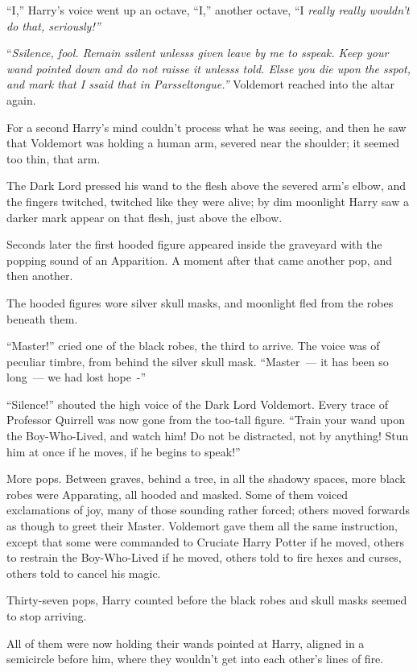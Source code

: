 ``I,'' Harry's voice went up an octave, ``I,'' another octave, ``I \emph{really really wouldn't do that, seriously!''}

``\emph{Ssilence, fool. Remain ssilent unlesss given leave by me to sspeak. Keep your wand pointed down and do not raisse it unlesss told. Elsse you die upon the sspot, and mark that I ssaid that in Parsseltongue.''} Voldemort reached into the altar again.

For a second Harry's mind couldn't process what he was seeing, and then he saw that Voldemort was holding a human arm, severed near the shoulder; it seemed too thin, that arm.

The Dark Lord pressed his wand to the flesh above the severed arm's elbow, and the fingers twitched, twitched like they were alive; by dim moonlight Harry saw a darker mark appear on that flesh, just above the elbow.

Seconds later the first hooded figure appeared inside the graveyard with the popping sound of an Apparition. A moment after that came another pop, and then another.

The hooded figures wore silver skull masks, and moonlight fled from the robes beneath them.

``Master!'' cried one of the black robes, the third to arrive. The voice was of peculiar timbre, from behind the silver skull mask. ``Master~--- it has been so long~--- we had lost hope~-''

``Silence!'' shouted the high voice of the Dark Lord Voldemort. Every trace of Professor Quirrell was now gone from the too-tall figure. ``Train your wand upon the Boy-Who-Lived, and watch him! Do not be distracted, not by anything! Stun him at once if he moves, if he begins to speak!''

More pops. Between graves, behind a tree, in all the shadowy spaces, more black robes were Apparating, all hooded and masked. Some of them voiced exclamations of joy, many of those sounding rather forced; others moved forwards as though to greet their Master. Voldemort gave them all the same instruction, except that some were commanded to Cruciate Harry Potter if he moved, others to restrain the Boy-Who-Lived if he moved, others told to fire hexes and curses, others told to cancel his magic.

Thirty-seven pops, Harry counted before the black robes and skull masks seemed to stop arriving.

All of them were now holding their wands pointed at Harry, aligned in a semicircle before him, where they wouldn't get into each other's lines of fire.

